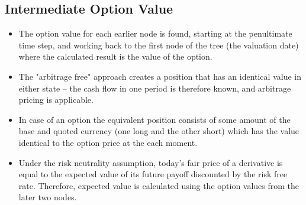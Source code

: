 \documentclass[_international_finance_p1.tex]{subfiles}
\begin{document}
\subsection{Intermediate Option Value}
\begin{frame}{}
\begin{itemize}[<+->]
\item
The option value for each earlier node is found, starting at the penultimate time step, and working back to the first node of the tree (the valuation date) where the calculated result is the value of the option.
\item
The "arbitrage free" approach creates a position that has an identical value in either state – the cash flow in one period is therefore known, and arbitrage pricing is applicable. 
\end{itemize}
\end{frame}
\begin{frame}{}
\begin{itemize}[<+->]
\item
In case of an option the equivalent position consists of some amount of the base and quoted currency (one long and the other short) which has the value identical to the option price at the each moment.
\item
Under the risk neutrality assumption, today's fair price of a derivative is equal to the expected value of its future payoff discounted by the risk free rate. Therefore, expected value is calculated using the option values from the later two nodes.
\end{itemize}
\end{frame}
\end{document}
